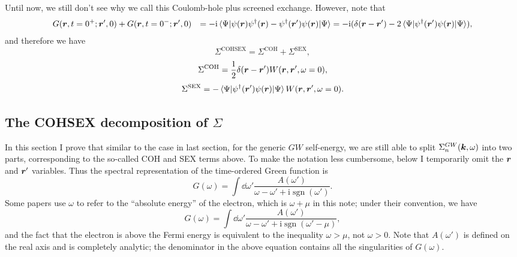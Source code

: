 \documentclass[hyperref, a4paper, 12pt]{report}
\DeclareMathOperator{\sgn}{sgn}
\newcommand*{\ii}{\mathrm{i}}
\def\\{}%
\begin{document}
Until now, we still don't see 
why we call this Coulomb-hole plus screened exchange.
However, note that 
\[
    \begin{aligned}
        &\quad G(\vb*{r}, t = 0^+; \vb*{r}', 0) + 
        G(\vb*{r}, t = 0^-; \vb*{r}', 0) \\
        &= - \ii \expval*{\psi(\vb*{r}) \psi^\dagger(\vb*{r}) - \psi^\dagger(\vb*{r}') \psi(\vb*{r})}{\Psi} \\
        &= - \ii (\delta(\vb*{r} - \vb*{r}') - 
        2 \expval*{\psi^\dagger(\vb*{r}') \psi(\vb*{r})}{\Psi}),
    \end{aligned}
\]
and therefore we have 
\begin{equation}
    \Sigma^{\text{COHSEX}} = \Sigma^{\text{COH}} + \Sigma^{\text{SEX}},
\end{equation}
\begin{equation}
    \Sigma^{\text{COH}} = \frac{1}{2} \delta(\vb*{r} - \vb*{r}') 
    W(\vb*{r}, \vb*{r}', \omega = 0), 
    \label{eq:sigma-coh-general}
\end{equation}
\begin{equation}
    \Sigma^{\text{SEX}} = - \expval*{\psi^\dagger(\vb*{r}') \psi(\vb*{r})}{\Psi}
    W(\vb*{r}, \vb*{r}', \omega = 0).
    \label{eq:sigma-sex-general}
\end{equation}

\subsection{The COHSEX decomposition of $\Sigma$}

In this section I prove that 
similar to the case in last section, 
for the generic $GW$ self-energy, 
we are still able to split $\Sigma^{GW}_n(\vb*{k}, \omega)$
into two parts, 
corresponding to the so-called COH and SEX terms above. 
To make the notation less cumbersome,
below I temporarily omit the $\vb*{r}$ and $\vb*{r}'$ variables.
Thus the spectral representation of the time-ordered Green function is 
\begin{equation}
    G(\omega) = \int \dd{\omega'} \frac{A(\omega')}{\omega - \omega' + \ii \sgn(\omega')}.
\end{equation}
Some papers use $\omega$ to refer to the ``absolute energy'' of the electron, 
which is $\omega + \mu$ in this note; 
under their convention, we have 
\begin{equation}
    G(\omega) = \int \dd{\omega'} \frac{A(\omega')}{\omega - \omega' + \ii \sgn(\omega' - \mu)},
\end{equation}
and the fact that the electron is above the Fermi energy 
is equivalent to the inequality $\omega > \mu$, 
not $\omega > 0$.
Note that $A(\omega')$ is defined on the real axis 
and is completely analytic;
the denominator in the above equation contains all the singularities of $G(\omega)$.
\end{document}
